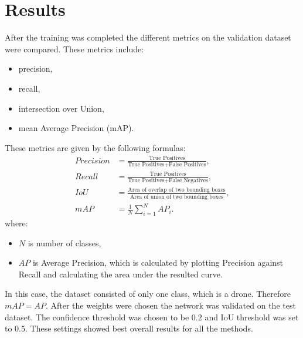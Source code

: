 \documentclass[twoside]{ctuthesis}
\theoremstyle{plain}
\theoremstyle{definition}
\theoremstyle{note}
\begin{document}
\chapter{Results}
After the training was completed the different metrics on the validation dataset were compared. These metrics include:
\begin{itemize}
	\item precision,
	\item recall,
	\item intersection over Union,
	\item mean Average Precision (mAP).
\end{itemize}
These metrics are given by the following formulas:
\begin{equation}
\begin{aligned}
	Precision &= \frac{\text{True Positives}}{\text{True Positives} + \text{False Positives}},\\
	Recall &= \frac{\text{True Positives}}{\text{True Positives} + \text{False Negatives}},\\
	IoU &= \frac{\text{Area of overlap of two bounding boxes}}{\text{Area of union of two bounding boxes}},\\
	mAP &= \frac{1}{N}\sum^N_{i=1}AP_i.
\end{aligned}
\end{equation}
where:
\begin{itemize}
	\item $N$ is number of classes,
	\item $AP$ is Average Precision, which is calculated by plotting Precision against Recall and calculating the area under the resulted curve.
\end{itemize}
In this case, the dataset consisted of only one class, which is a drone. Therefore $mAP=AP$. After the weights were chosen the network was validated on the test dataset. The confidence threshold was chosen to be $0.2$ and IoU threshold was set to $0.5$. These settings showed best overall results for all the methods.
\end{document}
